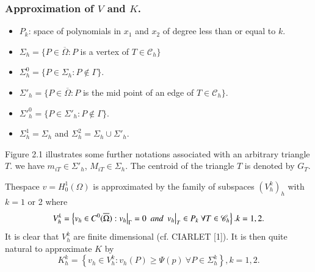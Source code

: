  \subsubsection{Approximation of $V$ and
$K$.}\label{c2:sss2.5.1}%
 
 \begin{itemize}
 \item $P_k$: space of polynomials in $x_1$ and $x_2$ of degree less
   than or equal to $k$. 
 \item $\Sigma_h = \{P \in \overline{\Omega} : P$ is a vertex of $T
   \in \mathscr{C}_h \}$ 
 \item $\Sigma^0 _h = \{ P \in \Sigma_h : P \notin \Gamma \}$.
 \item $\Sigma'_h = \{P \in \overline{\Omega} : P $ is the mid
   point of an edge of $T \in \mathscr{C}_h \}$. 
 \item $\Sigma'^0_h = \{ P \in \Sigma'_h : P \notin \Gamma \}$.
 \item $\Sigma^1_h = \Sigma_h $ and $\Sigma^2_h = \Sigma_h \cup \Sigma'_h$.
 \end{itemize}  
 
 Figure 2.1  illustrates some further notations associated with an
 arbitrary triangle $T$. we have $m_{iT} \in \Sigma'_h$, $M_{iT}
 \in \Sigma_h$. The centroid of the triangle $T$ is denoted by
 $G_T$. 
 
\begin{figure}[H]
\caption{}\label{c2:fig2.1}
\end{figure}
 
 The\pageoriginale  space $v = H^1 _0 (\Omega)$ is approximated by the
 family of 
 subspaces $(V^k_h)_h$ with $k=1$ or 2 where  
$$
V^k_h = \left\{ v_h \in C^0 (\overline{\Omega}) : v_h \big| _\Gamma = 0
~~\text{\em and } ~v_h \big|_T \in P_k ~\forall T \in \mathscr{C}_h
\right\}. k=1, 2. 
$$ 
 It is clear that $V^k_h$ are finite dimensional (cf. CIARLET [1]). It
 is then quite natural to approximate $K$ by  
$$
K^k_h = \left\{ v_h \in V^k_h : v_h (P) \geq \Psi (p)\ \forall P
\in \Sigma^k_h \right\}, k=1, 2. 
$$
 
